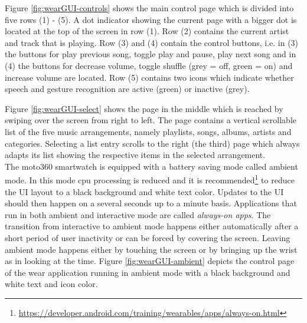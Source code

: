 Figure \ref{fig:wearGUI-controls} shows the main control page which is divided into five rows (1) - (5). A dot indicator showing the current page with a bigger dot is located at the top of the screen in row (1). Row (2) contains the current artist and track that is playing. Row (3) and (4) contain the control buttons, i.e. in (3) the buttons for play previous song, toggle play and pause, play next song and in (4) the buttons for decrease volume, toggle shuffle (grey = off, green = on) and increase volume are located. Row (5) contains two icons which indicate whether speech and gesture recognition are active (green) or inactive (grey).

Figure \ref{fig:wearGUI-select} shows the page in the middle which is reached by swiping over the screen from right to left. The page contains a vertical scrollable list of the five music arrangements, namely playlists, songs, albums, artists and categories. Selecting a list entry scrolls to the right (the third) page which always adapts its list showing the respective items in the selected arrangement. \\

The moto360 smartwatch is equipped with a battery saving mode called ambient mode. In this mode cpu processing is reduced and it is recommended\footnote{\url{https://developer.android.com/training/wearables/apps/always-on.html}} to reduce the \ac{UI} layout to a black background and white text color. Updates to the \ac{UI} should then happen on a several seconds up to a minute basis. Applications that run in both ambient and interactive mode are called \textit{always-on apps}. The transition from interactive to ambient mode happens either automatically after a short period of user inactivity or can be forced by covering the screen. Leaving ambient mode happens either by touching the screen or by bringing up the wrist as in looking at the time. Figure \ref{fig:wearGUI-ambient} depicts the control page of the wear application running in ambient mode with a black background and white text and icon color. \\

